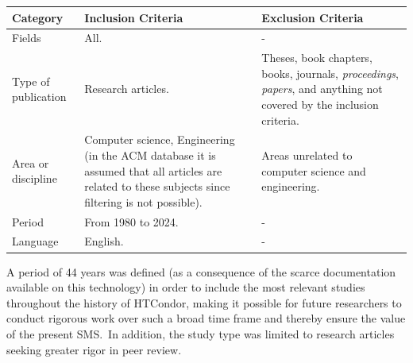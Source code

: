 \begin{table}
	{\begin{tabular}{p{2.7cm}p{5cm}p{5cm}} \toprule
			\textbf{Category}   & \textbf{Inclusion Criteria}                                                                                                                        & \textbf{Exclusion Criteria}                                                                                                        \\
			\midrule
			Fields              & All.                                                                                                                                               & -                                                                                                                                  \\
			Type of publication & Research articles.                                                                                                                                 & Theses, book chapters, books, journals, \textit{proceedings}, \textit{papers}, and anything not covered by the inclusion criteria. \\
			Area or discipline  & Computer science, Engineering (in the ACM database it is assumed that all articles are related to these subjects since filtering is not possible). & Areas unrelated to computer science and engineering.                                                                               \\
			Period              & From 1980 to 2024.                                                                                                                                 & -                                                                                                                                  \\
			Language            & English.                                                                                                                                           & -                                                                                                                                  \\
			\bottomrule
		\end{tabular}}
	\label{table:Criteria}
\end{table}

A period of 44 years was defined (as a consequence of the scarce documentation available on this technology) in order to include the most relevant studies throughout the history of HTCondor, making it possible for future researchers to conduct rigorous work over such a broad time frame and thereby ensure the value of the present SMS.~In addition, the study type was limited to research articles seeking greater rigor in peer review.


